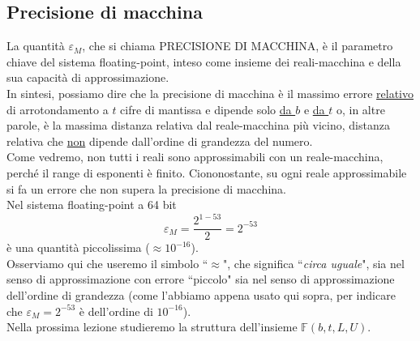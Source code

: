 \subsection{Precisione di macchina}
La quantità $\varepsilon_M$, che si chiama PRECISIONE DI MACCHINA, è il parametro chiave del sistema floating-point, inteso come insieme dei reali-macchina e della sua capacità di approssimazione. \\
In sintesi, possiamo dire che la precisione di macchina è il massimo errore \uline{relativo} di arrotondamento a $t$ cifre di mantissa e dipende solo \uline{da $b$} e \uline{da $t$} o, in altre parole, è la massima distanza relativa dal reale-macchina più vicino, distanza relativa che \uline{non} dipende dall'ordine di grandezza del numero. \\
Come vedremo, non tutti i reali sono approssimabili con un reale-macchina, perché il range di esponenti è finito. Ciononostante, su ogni reale approssimabile si fa un errore che non supera la precisione di macchina. \\
Nel sistema floating-point a 64 bit \[ \varepsilon_M = \frac{2^{1-53}}{2} = 2^{-53}\] 
è una quantità piccolissima ($\approx 10^{-16}$). \\
Osserviamo qui che useremo il simbolo ``$\approx$", che significa ``\textit{circa uguale}", sia nel senso di approssimazione con errore ``piccolo" sia nel senso di approssimazione dell'ordine di grandezza (come l'abbiamo appena usato qui sopra, per indicare che $\varepsilon_M = 2^{-53}$ è dell'ordine di $10^{-16}$). \\
Nella prossima lezione studieremo la struttura dell'insieme $\mathbb{F}(b, t, L, U)$.
\newpage